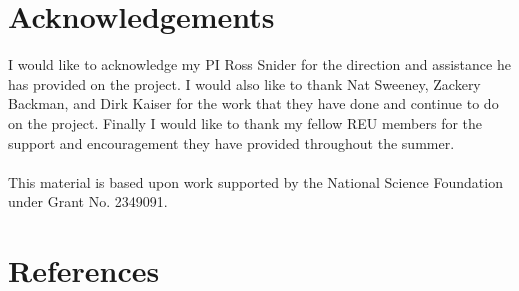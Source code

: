 \documentclass{article}
\begin{document}
\section{Acknowledgements}
I would like to acknowledge my PI Ross Snider for the direction and assistance he has provided on the project. I would also like to thank Nat Sweeney, Zackery Backman, and Dirk Kaiser for the work that they have done and continue to do on the project. Finally I would like to thank my fellow REU members for the support and encouragement they have provided throughout the summer.\\\\
This material is based upon work supported by the National Science Foundation under Grant No. 2349091.

\section{References}
\nocite{*}


\end{document}

